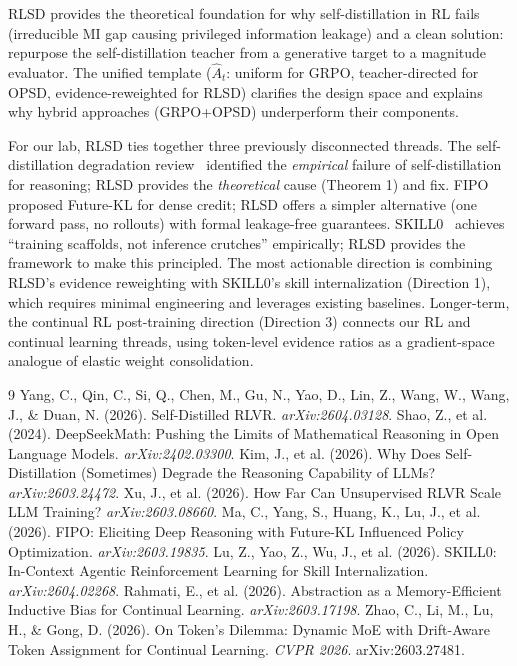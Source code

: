 \documentclass[11pt]{article}
\begin{document}
RLSD provides the theoretical foundation for why self-distillation in RL fails (irreducible MI gap causing privileged information leakage) and a clean solution: repurpose the self-distillation teacher from a generative target to a magnitude evaluator. The unified template ($\hat{A}_t$: uniform for GRPO, teacher-directed for OPSD, evidence-reweighted for RLSD) clarifies the design space and explains why hybrid approaches (GRPO+OPSD) underperform their components.

For our lab, RLSD ties together three previously disconnected threads. The self-distillation degradation review~\cite{selfdistill} identified the \textit{empirical} failure of self-distillation for reasoning; RLSD provides the \textit{theoretical} cause (Theorem 1) and fix. FIPO~\cite{fipo} proposed Future-KL for dense credit; RLSD offers a simpler alternative (one forward pass, no rollouts) with formal leakage-free guarantees. SKILL0~\cite{skill0} achieves ``training scaffolds, not inference crutches'' empirically; RLSD provides the framework to make this principled. The most actionable direction is combining RLSD's evidence reweighting with SKILL0's skill internalization (Direction 1), which requires minimal engineering and leverages existing baselines. Longer-term, the continual RL post-training direction (Direction 3) connects our RL and continual learning threads, using token-level evidence ratios as a gradient-space analogue of elastic weight consolidation.

\begin{thebibliography}{9}
 Yang, C., Qin, C., Si, Q., Chen, M., Gu, N., Yao, D., Lin, Z., Wang, W., Wang, J., \& Duan, N. (2026). Self-Distilled RLVR. \textit{arXiv:2604.03128}.
 Shao, Z., et al. (2024). DeepSeekMath: Pushing the Limits of Mathematical Reasoning in Open Language Models. \textit{arXiv:2402.03300}.
 Kim, J., et al. (2026). Why Does Self-Distillation (Sometimes) Degrade the Reasoning Capability of LLMs? \textit{arXiv:2603.24472}.
 Xu, J., et al. (2026). How Far Can Unsupervised RLVR Scale LLM Training? \textit{arXiv:2603.08660}.
 Ma, C., Yang, S., Huang, K., Lu, J., et al. (2026). FIPO: Eliciting Deep Reasoning with Future-KL Influenced Policy Optimization. \textit{arXiv:2603.19835}.
 Lu, Z., Yao, Z., Wu, J., et al. (2026). SKILL0: In-Context Agentic Reinforcement Learning for Skill Internalization. \textit{arXiv:2604.02268}.
 Rahmati, E., et al. (2026). Abstraction as a Memory-Efficient Inductive Bias for Continual Learning. \textit{arXiv:2603.17198}.
 Zhao, C., Li, M., Lu, H., \& Gong, D. (2026). On Token's Dilemma: Dynamic MoE with Drift-Aware Token Assignment for Continual Learning. \textit{CVPR 2026}. arXiv:2603.27481.
\end{thebibliography}
\end{document}
